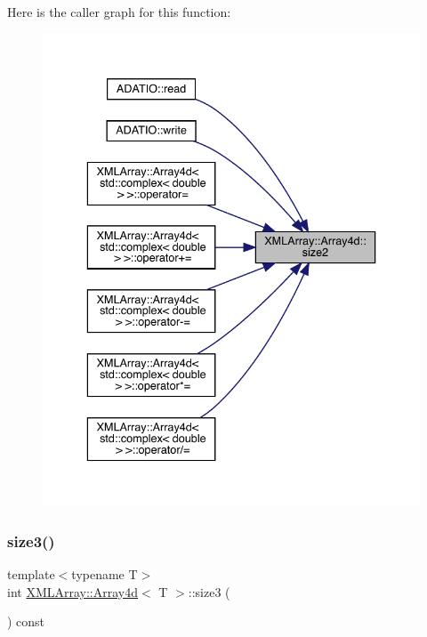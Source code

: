 Here is the caller graph for this function\+:\nopagebreak
\begin{figure}[H]
\begin{center}
\leavevmode
\includegraphics[width=336pt]{de/d16/classXMLArray_1_1Array4d_a18c3f8237c652b642c5de6df15764c34_icgraph}
\end{center}
\end{figure}
\mbox{\label{classXMLArray_1_1Array4d_ae9c6211389f5a1fd2bc756bb5e7b53b1}} 
\subsubsection{\texorpdfstring{size3()}{size3()}\hspace{0.1cm}{\footnotesize\ttfamily [1/2]}}
{\footnotesize\ttfamily template$<$typename T$>$ \\
int \mbox{\hyperlink{classXMLArray_1_1Array4d}{X\+M\+L\+Array\+::\+Array4d}}$<$ T $>$\+::size3 (\begin{DoxyParamCaption}{ }\end{DoxyParamCaption}) const\hspace{0.3cm}{\ttfamily [inline]}}

